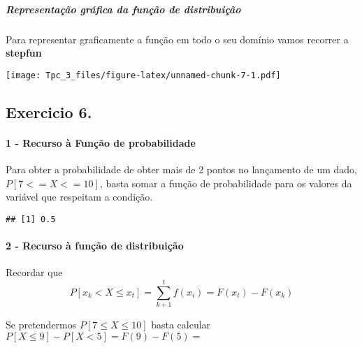 \documentclass[
]{article}
\newenvironment{Shaded}{\begin{snugshade}}{\end{snugshade}}
\newcommand{\DecValTok}[1]{\textcolor[rgb]{0.00,0.00,0.81}{#1}}
\newcommand{\FunctionTok}[1]{\textcolor[rgb]{0.00,0.00,0.00}{#1}}
\newcommand{\NormalTok}[1]{#1}
\newcommand{\SpecialCharTok}[1]{\textcolor[rgb]{0.00,0.00,0.00}{#1}}
\begin{document}
\hypertarget{representauxe7uxe3o-gruxe1fica-da-funuxe7uxe3o-de-distribuiuxe7uxe3o}{%
\subparagraph{Representação gráfica da função de
distribuição}\label{representauxe7uxe3o-gruxe1fica-da-funuxe7uxe3o-de-distribuiuxe7uxe3o}}

Para representar graficamente a função em todo o seu domínio vamos
recorrer a \textbf{stepfun}

\texttt{[image: Tpc\_3\_files/figure-latex/unnamed-chunk-7-1.pdf]}

\hypertarget{exercicio-6.}{%
\subsection{Exercicio 6.}\label{exercicio-6.}}

\hypertarget{recurso-uxe0-funuxe7uxe3o-de-probabilidade}{%
\paragraph{1 - Recurso à Função de
probabilidade}\label{recurso-uxe0-funuxe7uxe3o-de-probabilidade}}

Para obter a probabilidade de obter mais de 2 pontos no lançamento de um
dado, \(P[7 <= X <= 10]\), basta somar a função de probabilidade para os
valores da variável que respeitam a condição.

\begin{Shaded}
\end{Shaded}

\begin{verbatim}
## [1] 0.5
\end{verbatim}

\hypertarget{recurso-uxe0-funuxe7uxe3o-de-distribuiuxe7uxe3o}{%
\paragraph{2 - Recurso à função de
distribuição}\label{recurso-uxe0-funuxe7uxe3o-de-distribuiuxe7uxe3o}}

Recordar que \[P[x_k<X \le x_t ]=\sum_{k+1}^t f(x_i)=F(x_t)-F(x_k)\]

Se pretendermos \(P[7\le X \le 10]\) basta calcular
\(P[X \le 9]-P[X < 5]=F(9)-F(5)=\)
\end{document}
